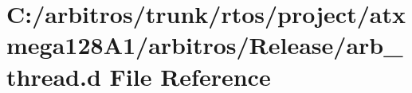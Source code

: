 \hypertarget{rtos_2project_2atxmega128_a1_2arbitros_2_release_2arb__thread_8d}{\section{C\-:/arbitros/trunk/rtos/project/atxmega128\-A1/arbitros/\-Release/arb\-\_\-thread.d File Reference}
\label{rtos_2project_2atxmega128_a1_2arbitros_2_release_2arb__thread_8d}
}
